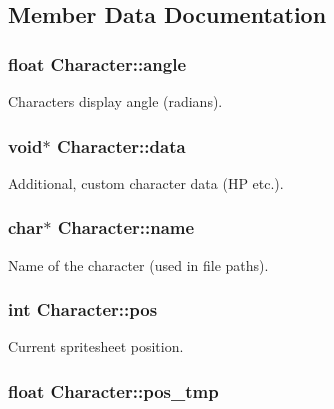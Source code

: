 \subsection{Member Data Documentation}
\hypertarget{structCharacter_aaea3868e61a383b338ffef0949dc5d0c}{
\subsubsection[{angle}]{\setlength{\rightskip}{0pt plus 5cm}float Character\+::angle}}\label{structCharacter_aaea3868e61a383b338ffef0949dc5d0c}
Characters display angle (radians). \hypertarget{structCharacter_a501e967c7ba98f87aaf55772236f9d30}{
\subsubsection[{data}]{\setlength{\rightskip}{0pt plus 5cm}void$\ast$ Character\+::data}}\label{structCharacter_a501e967c7ba98f87aaf55772236f9d30}
Additional, custom character data (H\+P etc.). \hypertarget{structCharacter_a35b249bfc82c52eebf91ae3999004105}{
\subsubsection[{name}]{\setlength{\rightskip}{0pt plus 5cm}char$\ast$ Character\+::name}}\label{structCharacter_a35b249bfc82c52eebf91ae3999004105}
Name of the character (used in file paths). \hypertarget{structCharacter_ad905575b0331709b6188af9423b3aee1}{
\subsubsection[{pos}]{\setlength{\rightskip}{0pt plus 5cm}int Character\+::pos}}\label{structCharacter_ad905575b0331709b6188af9423b3aee1}
Current spritesheet position. \hypertarget{structCharacter_ac4da775bb44e81c8b33ffb1cb1f75108}{
\subsubsection[{pos\+\_\+tmp}]{\setlength{\rightskip}{0pt plus 5cm}float Character\+::pos\+\_\+tmp}}\label{structCharacter_ac4da775bb44e81c8b33ffb1cb1f75108}
